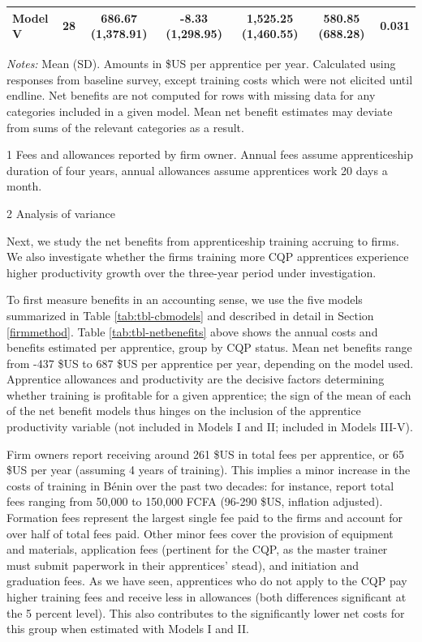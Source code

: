 \documentclass[
  a4paper, twoside, 12pt]{book}
\begin{document}
\begin{table}[H]
{\begin{threeparttable}
\begin{tabular}[t]{lcccccc}
\hspace{1em}Model V & 28 & 686.67 (1,378.91) & -8.33 (1,298.95) & 1,525.25 (1,460.55) & 580.85 (688.28) & 0.031\\
\bottomrule
\end{tabular}
\begin{tablenotes}
\small
\item \textit{Notes:} Mean (SD). Amounts in \$US per apprentice per year. Calculated using responses from baseline survey, except training costs which were not elicited until endline. Net benefits are not computed for rows with missing data for any categories included in a given model. Mean net benefit estimates may deviate from sums of the relevant categories as a result.
\item[1] Fees and allowances reported by firm owner. Annual fees assume apprenticeship duration of four years, annual allowances assume apprentices work 20 days a month.
\item[2] Analysis of variance
\end{tablenotes}
\end{threeparttable}}
\end{table}

Next, we study the net benefits from apprenticeship training accruing to firms. We also investigate whether the firms training more CQP apprentices experience higher productivity growth over the three-year period under investigation.

To first measure benefits in an accounting sense, we use the five models summarized in Table \ref{tab:tbl-cbmodels} and described in detail in Section \ref{firmmethod}. Table \ref{tab:tbl-netbenefits} above shows the annual costs and benefits estimated per apprentice, group by CQP status. Mean net benefits range from -437 \$US to 687 \$US per apprentice per year, depending on the model used. Apprentice allowances and productivity are the decisive factors determining whether training is profitable for a given apprentice; the sign of the mean of each of the net benefit models thus hinges on the inclusion of the apprentice productivity variable (not included in Models I and II; included in Models III-V).

Firm owners report receiving around 261 \$US in total fees per apprentice, or 65 \$US per year (assuming 4 years of training). This implies a minor increase in the costs of training in Bénin over the past two decades: for instance, \textcite{walther2007} report total fees ranging from 50,000 to 150,000 FCFA (96-290 \$US, inflation adjusted). Formation fees represent the largest single fee paid to the firms and account for over half of total fees paid. Other minor fees cover the provision of equipment and materials, application fees (pertinent for the CQP, as the master trainer must submit paperwork in their apprentices' stead), and initiation and graduation fees. As we have seen, apprentices who do not apply to the CQP pay higher training fees and receive less in allowances (both differences significant at the 5 percent level). This also contributes to the significantly lower net costs for this group when estimated with Models I and II.
\end{document}

